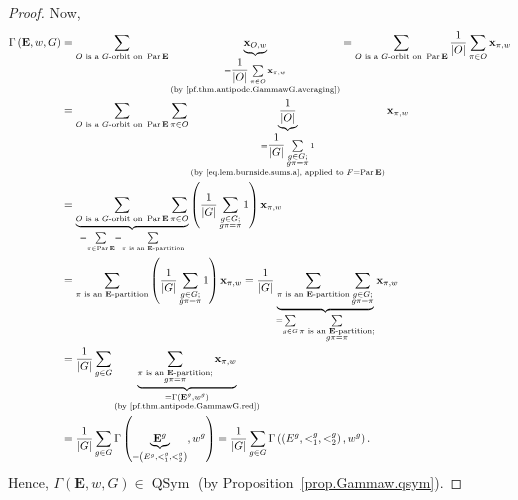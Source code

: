 \documentclass[12pt]{article}
\theoremstyle{plain}
\theoremstyle{definition}
\theoremstyle{remark}
\let\sumnonlimits\sum
\renewcommand{\sum}{\sumnonlimits\limits}
\newcommand{\xx}{{\mathbf{x}}}
\newcommand{\QSym}{{\operatorname{QSym}}}
\newcommand{\Par}{\operatorname{Par}}
\newcommand{\EE}{{\mathbf{E}}}
\begin{document}
\begin{proof}
Now,
\begin{align}
\Gamma\left( \EE , w, G\right)   &  =\sum_{O\text{ is a
}G\text{-orbit on } \Par \EE }\underbrace{\xx_{O,w}}_{
\substack{=\dfrac{1}{\left\vert O\right\vert }\sum\limits_{\pi\in
O}\xx_{\pi,w}\\\text{(by \eqref{pf.thm.antipode.GammawG.averaging})}%
}}=\sum_{O\text{ is a }G\text{-orbit on } \Par \EE }
\dfrac{1}{\left\vert O\right\vert }\sum\limits_{\pi\in O}\xx_{\pi
,w}\nonumber\\
&  =\sum_{O\text{ is a }G\text{-orbit on } \Par \EE
}\sum\limits_{\pi\in O}\underbrace{\dfrac{1}{\left\vert O\right\vert }%
}_{\substack{=\dfrac{1}{\left\vert G\right\vert }\sum_{\substack{g\in
G;\\g\pi=\pi}}1\\\text{(by \eqref{eq.lem.burnside.sums.a}, applied to }
F = \Par\EE {)}}}\xx_{\pi,w}
\nonumber\\
& = \underbrace{\sum_{O \text{ is a } G\text{-orbit on } \Par \EE}
\sum\limits_{\pi\in O}}_{=\sum_{\pi\in \Par \EE }
=\sum_{\pi\text{ is an } \EE \text{-partition}}}
\left(
\dfrac{1}{\left\vert G\right\vert }\sum_{\substack{g\in G;\\g\pi=\pi
}}1\right)  \xx_{\pi,w}\nonumber\\
&  =\sum_{\pi\text{ is an } \EE \text{-partition}}\left(  \dfrac
{1}{\left\vert G\right\vert }\sum_{\substack{g\in G;\\g\pi=\pi}}1\right)
\xx_{\pi,w}=\dfrac{1}{\left\vert G\right\vert }\underbrace{\sum
_{\pi\text{ is an } \EE \text{-partition}}\sum_{\substack{g\in
G;\\g\pi=\pi}}}_{=\sum_{g\in G}\sum_{\substack{\pi\text{ is an }\EE
\text{-partition;}\\g\pi=\pi}}}\xx_{\pi,w}\nonumber\\
&  =\dfrac{1}{\left\vert G\right\vert }\sum_{g\in G}\underbrace{\sum
_{\substack{\pi\text{ is an } \EE \text{-partition;}\\g\pi=\pi
}}\xx_{\pi,w}}_{\substack{=\Gamma\left(   \EE ^{g},w^{g}\right)
\\\text{(by \eqref{pf.thm.antipode.GammawG.red})}}}\nonumber\\
&  =\dfrac{1}{\left\vert G\right\vert }\sum_{g\in G}\Gamma\left(
\underbrace{ \EE ^{g}}_{=\left(  E^{g},<_{1}^{g},<_{2}^{g}\right)
},w^{g}\right)  =\dfrac{1}{\left\vert G\right\vert }\sum_{g\in G}\Gamma\left(
\left(  E^{g},<_{1}^{g},<_{2}^{g}\right)  ,w^{g}\right)
.
\label{pf.thm.antipode.GammawG.1}
\end{align}
Hence, $\Gamma\left(  { \EE },w,G\right) \in \QSym$
(by Proposition~\ref{prop.Gammaw.qsym}).



\end{proof}
\end{document}
